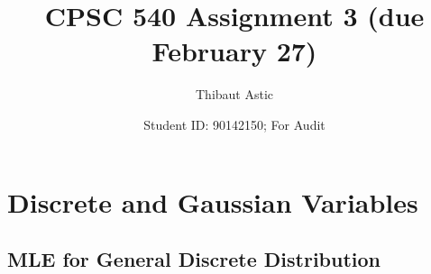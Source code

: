 \documentclass{article}
\begin{document}
\def\blu#1{{\color{blu}#1}}
\def\gre#1{{\color{gre}#1}}
\def\red#1{{\color{red}#1}}
\def\norm#1{\|#1\|}
\newcommand{\argmin}[1]{\mathop{\hbox{argmin}}_{#1}}
\newcommand{\argmax}[1]{\mathop{\hbox{argmax}}_{#1}}
\def\R{\mathbb{R}}
\newcommand{\fig}[2]{\texttt{[image: a3f/\#2]}}
\newcommand{\centerfig}[2]{\begin{center}\texttt{[image: a3f/\#2]}\end{center}}
\def\items#1{\begin{itemize}#1\end{itemize}}
\def\enum#1{\begin{enumerate}#1\end{enumerate}}
\def\argmax{\mathop{\rm arg\,max}}
\def\argmin{\mathop{\rm arg\,min}}
\def\half{\frac 1 2}
\newcommand{\code}[1]{}
\newcommand{\alignStar}[1]{\begin{align*}#1\end{align*}}
\newcommand{\mat}[1]{\begin{bmatrix}#1\end{bmatrix}}


\newcommand{\del}[2]{\ensuremath{\frac{\partial#1}{\partial#2}}}



\title{CPSC 540 Assignment 3 (due February 27)}
\author{Thibaut Astic}
\date{Student ID: 90142150; For Audit}
\maketitle



\section{Discrete and Gaussian Variables}

\subsection{MLE for General Discrete Distribution}
\end{document}
